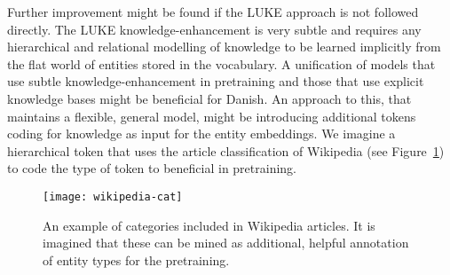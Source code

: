 \documentclass[main.tex]{subfiles}
\begin{document}
Further improvement might be found if the LUKE approach is not followed directly.
The LUKE knowledge-enhancement is very subtle and requires any hierarchical and relational modelling of knowledge to be learned implicitly from the flat world of entities stored in the vocabulary.
A unification of models that use subtle knowledge-enhancement in pretraining and those that use explicit knowledge bases might be beneficial for Danish.
An approach to this, that maintains a flexible, general model, might be introducing additional tokens coding for knowledge as input for the entity embeddings.
We imagine a hierarchical token that uses the article classification of Wikipedia (see Figure~\ref{fig:wikipedia-cat}) to code the type of token to beneficial in pretraining.
\begin{figure}[H]
    \centering
        \texttt{[image: wikipedia-cat]}
    \caption{An example of categories included in Wikipedia articles. It is imagined that these can be mined as additional, helpful annotation of entity types for the pretraining.}
    \label{fig:wikipedia-cat}
\end{figure}\noindent
\end{document}
